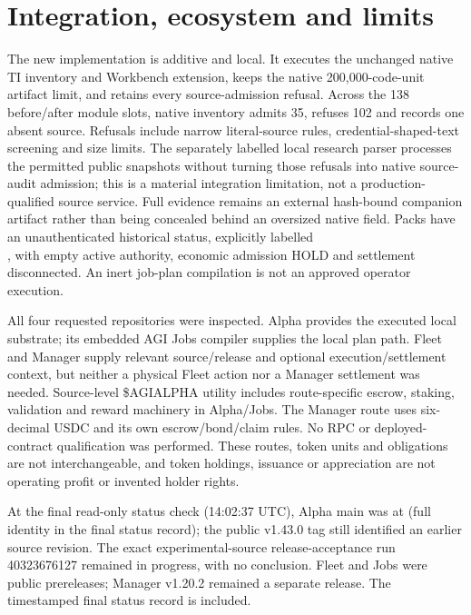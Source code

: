 \documentclass[11pt,letterpaper]{article}
\newcommand{\pathcode}[1]{{\small\ttfamily\detokenize{#1}}}
\begin{document}
\section{Integration, ecosystem and limits}
The new implementation is additive and local. It executes the unchanged native TI inventory and Workbench extension, keeps the native 200,000-code-unit artifact limit, and retains every source-admission refusal. Across the 138 before/after module slots, native inventory admits 35, refuses 102 and records one absent source. Refusals include narrow literal-source rules, credential-shaped-text screening and size limits. The separately labelled local research parser processes the permitted public snapshots without turning those refusals into native source-audit admission; this is a material integration limitation, not a production-qualified source service. Full evidence remains an external hash-bound companion artifact rather than being concealed behind an oversized native field. Packs have an unauthenticated historical status, explicitly labelled\\\pathcode{UNAUTHENTICATED_HISTORICAL_IMPORT}, with empty active authority, economic admission HOLD and settlement disconnected. An inert job-plan compilation is not an approved operator execution.

All four requested repositories were inspected. Alpha provides the executed local substrate; its embedded AGI Jobs compiler supplies the local plan path. Fleet and Manager supply relevant source/release and optional execution/settlement context, but neither a physical Fleet action nor a Manager settlement was needed. Source-level \$AGIALPHA utility includes route-specific escrow, staking, validation and reward machinery in Alpha/Jobs. The Manager route uses six-decimal USDC and its own escrow/bond/claim rules. No RPC or deployed-contract qualification was performed. These routes, token units and obligations are not interchangeable, and token holdings, issuance or appreciation are not operating profit or invented holder rights.

At the final read-only status check (14:02:37 UTC), Alpha main was at \pathcode{804e1afe} (full identity in the final status record); the public v1.43.0 tag still identified an earlier source revision. The exact experimental-source release-acceptance run 40323676127 remained in progress, with no conclusion. Fleet and Jobs were public prereleases; Manager v1.20.2 remained a separate release. The timestamped final status record is included.
\end{document}
